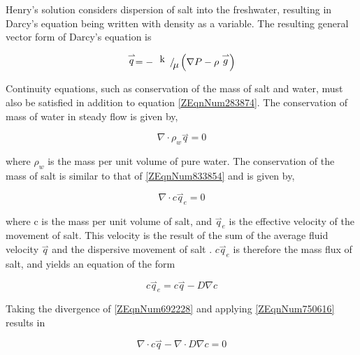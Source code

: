 Henry's solution considers dispersion of salt into the freshwater, resulting in Darcy's equation
being written with density as a variable. The resulting general vector form of Darcy's equation is

\begin{equation} \label{ZEqnNum283874}
    \stackrel{\rightharpoonup}{q}=-{\raise0.7ex\hbox{\spbox{k} } \!\mathord{\left/
    {\vphantom {k \mu }} \right. \kern-\nulldelimiterspace} \!\lower0.7ex\hbox{$ \mu
    $}} \left(\nabla P-\rho \stackrel{\rightharpoonup}{g} \right) 
\end{equation} 

Continuity equations, such as conservation of the mass of salt and water, must also be satisfied in
addition to equation \eqref{ZEqnNum283874}. The conservation of mass of water in steady flow is
given by,

\begin{equation} \label{ZEqnNum833854} 
    \nabla \cdot \rho _{w}
    \stackrel{\rightharpoonup}{q}=0 
\end{equation} 

where $\rho _{w} $ is the mass per unit volume of pure water. The conservation of the mass of salt
is similar to that of \eqref{ZEqnNum833854} and is given by,

\begin{equation} \label{ZEqnNum750616} 
    \nabla \cdot
    c\stackrel{\rightharpoonup}{q}_{e} =0 
\end{equation} 

where c is the mass per unit volume of salt, and $\stackrel{\rightharpoonup}{q}_{e} $ is the
effective velocity of the movement of salt. This velocity is the result of the sum of the average
fluid velocity $\stackrel{\rightharpoonup}{q}$ and the dispersive movement of salt \cite{Henry60}.
$c\stackrel{\rightharpoonup}{q}_{e} $ is therefore the mass flux of salt, and yields an equation of
the form

\begin{equation} \label{ZEqnNum692228} 
    c\stackrel{\rightharpoonup}{q}_{e} = c\stackrel{\rightharpoonup}{q}-D\nabla c 
\end{equation} 

Taking the divergence of \eqref{ZEqnNum692228} and applying
\eqref{ZEqnNum750616} results in

\begin{equation} 
    \label{ZEqnNum193707} \nabla \cdot
    c\stackrel{\rightharpoonup}{q}-\nabla \cdot D\nabla c=0 
\end{equation} 

